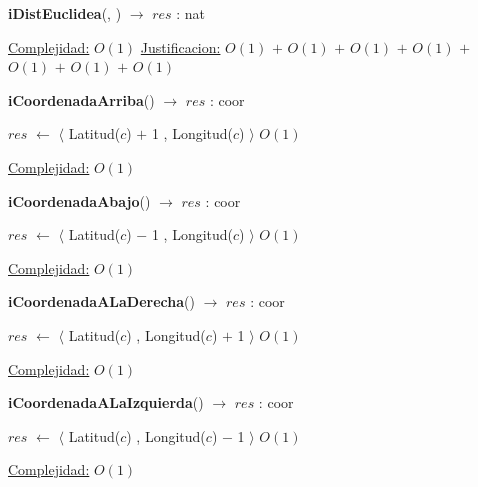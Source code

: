 \begin{Algoritmos}
\begin{algorithm}[H]{\textbf{iDistEuclidea}(, ) $\to$ $res$ : nat}
\begin{algorithmic}[1]
	\medskip
	\Statex \underline{Complejidad:} $O(1)$
	\Statex \underline{Justificacion:} $O(1)$ $+$ $O(1)$ $+$ $O(1)$ $+$ $O(1)$ $+$ $O(1)$ $+$ $O(1)$ $+$ $O(1)$
\end{algorithmic}
\end{algorithm}

\begin{algorithm}[H]{\textbf{iCoordenadaArriba}() $\to$ $res$ : coor}
\begin{algorithmic}[1]
	\State $res$ $\gets$  $\langle$ Latitud($c$) $+$ 1 , Longitud($c$) $\rangle$ \Comment $O(1)$

	\medskip
	\Statex \underline{Complejidad:} $O(1)$
\end{algorithmic}
\end{algorithm}


\begin{algorithm}[H]{\textbf{iCoordenadaAbajo}() $\to$ $res$ : coor}
\begin{algorithmic}[1]
	\State $res$ $\gets$  $\langle$ Latitud($c$) $-$ 1 , Longitud($c$) $\rangle$ \Comment $O(1)$

	\medskip
	\Statex \underline{Complejidad:} $O(1)$
\end{algorithmic}
\end{algorithm}

\begin{algorithm}[H]{\textbf{iCoordenadaALaDerecha}() $\to$ $res$ : coor}
\begin{algorithmic}[1]
	\State $res$ $\gets$  $\langle$ Latitud($c$) , Longitud($c$) $+$ 1 $\rangle$ \Comment $O(1)$

	\medskip
	\Statex \underline{Complejidad:} $O(1)$
\end{algorithmic}
\end{algorithm}

\begin{algorithm}[H]{\textbf{iCoordenadaALaIzquierda}() $\to$ $res$ : coor}
\begin{algorithmic}[1]
	\State $res$ $\gets$  $\langle$ Latitud($c$) , Longitud($c$) $-$ 1  $\rangle$ \Comment $O(1)$

	\medskip
	\Statex \underline{Complejidad:} $O(1)$
\end{algorithmic}
\end{algorithm}


\end{Algoritmos}